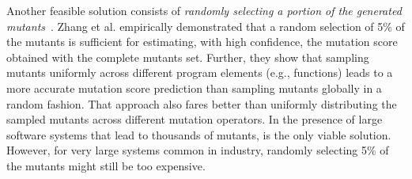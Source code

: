 Another feasible solution consists of  \emph{randomly selecting a portion of the generated mutants}~\cite{zhang2010operator,gopinath2015hard,zhang2013operator}. 
%
%
% 
Zhang et al. \cite{zhang2013operator} empirically demonstrated that a random selection of 5\% of the mutants is sufficient for 
estimating, with high confidence, the mutation score obtained with the complete mutants set.
Further,
they show that sampling mutants uniformly across different program elements (e.g., functions) %
leads to a more accurate mutation score prediction than sampling mutants globally in a random fashion. That approach also fares better than uniformly distributing the sampled mutants across different mutation operators. In the presence of large software systems that lead to thousands of mutants,  is the only viable solution. However, for very large systems common in industry, randomly selecting 5\% of the mutants might still be too expensive.

